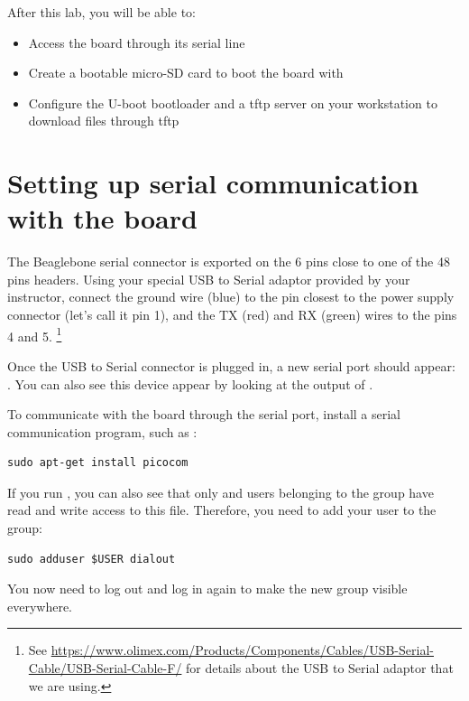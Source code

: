 
After this lab, you will be able to:
\begin{itemize}
\item Access the board through its serial line
\item Create a bootable micro-SD card to boot the 
      board with
\item Configure the U-boot bootloader and a tftp server
      on your workstation to download files through tftp
\end{itemize}

\section{Setting up serial communication with the board}

The Beaglebone serial connector is exported on the 6 pins close to one
of the 48 pins headers. Using your special USB to Serial adaptor provided
by your instructor, connect the ground wire (blue) to the pin closest
to the power supply connector (let's call it pin 1), and the TX (red)
and RX (green) wires to the pins 4 and 5.
\footnote{See
\url{https://www.olimex.com/Products/Components/Cables/USB-Serial-Cable/USB-Serial-Cable-F/}
for details about the USB to Serial adaptor that we are using.} 

Once the USB to Serial connector is plugged in, a new serial port
should appear: .  You can also see this device
appear by looking at the output of .

To communicate with the board through the serial port, install a
serial communication program, such as :

\begin{verbatim}
sudo apt-get install picocom
\end{verbatim}

If you run , you can also see that only
 and users belonging to the  group have
read and write access to this file. Therefore, you need to add your user
to the  group:

\begin{verbatim}
sudo adduser $USER dialout
\end{verbatim}

You now need to log out and log in again to make the new group
visible everywhere.

